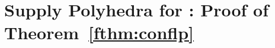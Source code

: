 \def\Supp{\mathsf{Supp}\xspace}
\newcommand{\barcalS}{\bar{\cal S}\xspace}
\renewcommand{\brp}{{(p)}}
\renewcommand{\br}[1]{{(#1)}}
\renewcommand{\brp}{{(p)}}
\renewcommand{\br}[1]{{(#1)}}
\renewcommand{\bc}{{\bar c}}
\newcommand{\brt}{{(t)}}
\def\cc{\tilde{c}}
\newcommand{\barD}{\bar{D}}
\def\calFr{\calF^{(\alpha,\beta)}}
\section{Supply Polyhedra for \cckp: Proof of Theorem~\ref{fthm:conflp}}\label{fsec:conflp}
%
